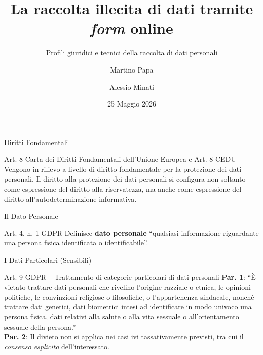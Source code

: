 \documentclass[aspectratio=169]{beamer}
\title[Raccolta illecita di dati tramite form]{La raccolta illecita di dati tramite \emph{form} online}
\subtitle{Profili giuridici e tecnici della raccolta di dati personali}
\author[M. Papa, A. Minati]{Martino Papa \and Alessio Minati}
\institute[IF]{Informatica Forense -- A.A. 2025/2026}
\date{25 Maggio 2026}
\begin{document}
\begin{frame}
  \titlepage
\end{frame}

\begin{frame}{Diritti Fondamentali}
  \begin{block}{Art. 8 Carta dei Diritti Fondamentali dell'Unione Europea e Art. 8 CEDU}
    Vengono in rilievo a livello di diritto fondamentale per la protezione dei dati personali. 
    Il diritto alla protezione dei dati personali si configura non soltanto come espressione del diritto alla riservatezza, ma anche come espressione del diritto all'autodeterminazione informativa.
  \end{block}
\end{frame}

\begin{frame}{Il Dato Personale}
  \begin{block}{Art. 4, n. 1 GDPR}
    Definisce \textbf{dato personale} ``qualsiasi informazione riguardante una persona fisica identificata o identificabile''.
  \end{block}
\end{frame}

\begin{frame}{I Dati Particolari (Sensibili)}
  \begin{block}{Art. 9 GDPR -- Trattamento di categorie particolari di dati personali}
    \small
    \textbf{Par. 1}: ``È vietato trattare dati personali che rivelino l'origine razziale o etnica, le opinioni politiche, le convinzioni religiose o filosofiche, o l'appartenenza sindacale, nonché trattare dati genetici, dati biometrici intesi ad identificare in modo univoco una persona fisica, dati relativi alla salute o alla vita sessuale o all'orientamento sessuale della persona.''\\
    \textbf{Par. 2}: Il divieto non si applica nei casi ivi tassativamente previsti, tra cui il \emph{consenso esplicito} dell'interessato.
  \end{block}
\end{frame}
\end{document}
